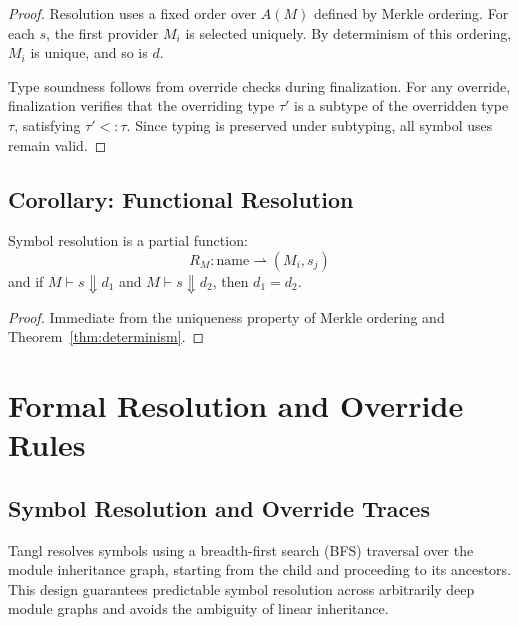 \documentclass[sigplan,screen]{acmart}
\begin{document}
\begin{proof}
Resolution uses a fixed order over $A(M)$ defined by Merkle ordering. For each $s$, the first provider $M_i$ is selected uniquely. By determinism of this ordering, $M_i$ is unique, and so is $d$.

Type soundness follows from override checks during finalization. For any override, finalization verifies that the overriding type $\tau'$ is a subtype of the overridden type $\tau$, satisfying $\tau' <: \tau$. Since typing is preserved under subtyping, all symbol uses remain valid.
\end{proof}

\subsection{Corollary: Functional Resolution}
\label{appendix:corollary-functional}

\begin{corollary}
Symbol resolution is a partial function:
\[
R_M : \text{name} \rightharpoonup (M_i, s_j)
\]
and if $M \vdash s \Downarrow d_1$ and $M \vdash s \Downarrow d_2$, then $d_1 = d_2$.
\end{corollary}

\begin{proof}
Immediate from the uniqueness property of Merkle ordering and Theorem~\ref{thm:determinism}.
\end{proof}

\section{Formal Resolution and Override Rules}

\subsection{Symbol Resolution and Override Traces}
\label{sec:resolution-traces}

Tangl resolves symbols using a breadth-first search (BFS) traversal over the module inheritance graph, starting from the child and proceeding to its ancestors. This design guarantees predictable symbol resolution across arbitrarily deep module graphs and avoids the ambiguity of linear inheritance. 
\end{document}

